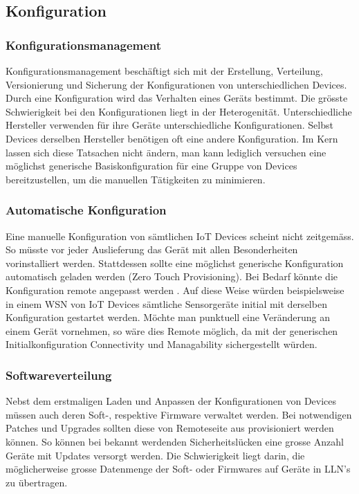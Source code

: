 \subsection{Konfiguration}
\subsubsection{Konfigurationsmanagement} Konfigurationsmanagement beschäftigt sich mit der Erstellung, Verteilung, Versionierung und Sicherung der Konfigurationen von unterschiedlichen Devices. Durch eine Konfiguration wird das Verhalten eines Geräts bestimmt. Die grösste Schwierigkeit bei den Konfigurationen liegt in der Heterogenität. Unterschiedliche Hersteller verwenden für ihre Geräte unterschiedliche Konfigurationen. Selbst Devices derselben Hersteller benötigen oft eine andere Konfiguration. Im Kern lassen sich diese Tatsachen nicht ändern, man kann lediglich versuchen eine möglichst generische Basiskonfiguration für eine Gruppe von Devices bereitzustellen, um die manuellen Tätigkeiten zu minimieren. 

\subsubsection{Automatische Konfiguration} Eine manuelle Konfiguration von sämtlichen IoT Devices scheint nicht zeitgemäss. So müsste vor jeder Auslieferung das Gerät mit allen Besonderheiten vorinstalliert werden. Stattdessen sollte eine möglichst generische Konfiguration automatisch geladen werden (Zero Touch Provisioning). Bei Bedarf könnte die Konfiguration remote angepasst werden \cite{Weber16}. Auf diese Weise würden beispielsweise in einem WSN von IoT Devices sämtliche Sensorgeräte initial mit derselben Konfiguration gestartet werden. Möchte man punktuell eine Veränderung an einem Gerät vornehmen, so wäre dies Remote möglich, da mit der generischen Initialkonfiguration Connectivity und Managability sichergestellt würden.

\subsubsection{Softwareverteilung} Nebst dem erstmaligen Laden und Anpassen der Konfigurationen von Devices müssen auch deren Soft-, respektive Firmware verwaltet werden. Bei notwendigen Patches und Upgrades sollten diese von Remoteseite aus provisioniert werden können. So können bei bekannt werdenden Sicherheitslücken eine grosse Anzahl Geräte mit Updates versorgt werden. Die Schwierigkeit liegt darin, die möglicherweise grosse Datenmenge der Soft- oder Firmwares auf Geräte in LLN's zu übertragen.

